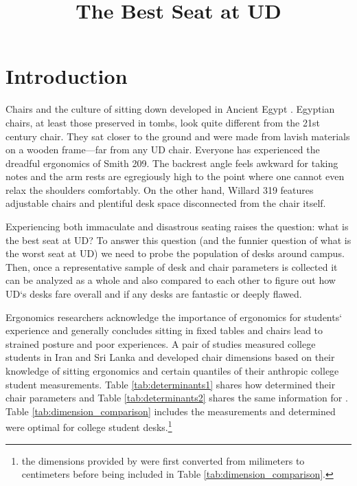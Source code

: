 \documentclass[conference]{IEEEtran}
\begin{document}
\title{The Best Seat at UD}

\author{
}

\maketitle




\section{Introduction}

Chairs and the culture of sitting down developed in Ancient Egypt \cite{egypt}. Egyptian chairs, at least those preserved in tombs, look quite different from the 21st century chair. They sat closer to the ground and were made from lavish materials on a wooden frame---far from any UD chair. Everyone has experienced the dreadful ergonomics of Smith 209. The backrest angle feels awkward for taking notes and the arm rests are egregiously high to the point where one cannot even relax the shoulders comfortably. On the other hand, Willard 319 features adjustable chairs and plentiful desk space disconnected from the chair itself. 

Experiencing both immaculate and disastrous seating raises the question: what is the best seat at UD? To answer this question (and the funnier question of what is the worst seat at UD) we need to probe the population of desks around campus. Then, once a representative sample of desk and chair parameters is collected it can be analyzed as a whole and also compared to each other to figure out how UD`s desks fare overall and if any desks are fantastic or deeply flawed.

Ergonomics researchers acknowledge the importance of ergonomics for students` experience and generally concludes sitting in fixed tables and chairs lead to strained posture and poor experiences\cite{mohamed}.  A pair of studies \cite{mohamed} \cite{Ansari} measured college students in Iran and Sri Lanka and developed chair dimensions based on their knowledge of sitting ergonomics and certain quantiles of their anthropic college student measurements. Table \ref*{tab:determinants1} shares how \cite{mohamed} determined their chair parameters and Table \ref*{tab:determinants2} shares the same information for \cite{Ansari}. Table \ref*{tab:dimension_comparison} includes the measurements \cite{mohamed} and \cite{Ansari} determined were optimal for college student desks.\footnote{the dimensions provided by \cite{mohamed} were first converted from  milimeters to centimeters before being included in Table \ref*{tab:dimension_comparison}.}
\end{document}
